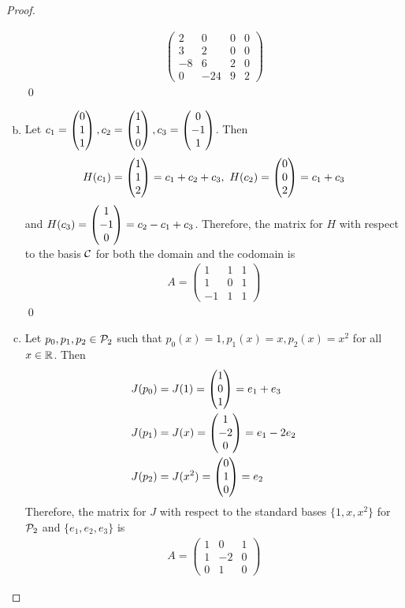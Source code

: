 \begin{proof}
\begin{enumerate}[(a)]
\[\begin{aligned}
\begin{pmatrix}
                    2 & 0 & 0 & 0\\
                    3 & 2 & 0 & 0\\
                    -8& 6 & 2 & 0\\
                    0 & -24 & 9 & 2
                \end{pmatrix}
            \end{aligned}
        \]\qed
        \item Let $c_1=\ColVecThree{0}{1}{1},c_2=\ColVecThree{1}{1}{0},c_3=\ColVecThree{0}{-1}{1}$. Then 
        \[
            \begin{aligned}
                &H(c_1)=\ColVecThree{1}{1}{2}=c_1+c_2+c_3,\ H(c_2)=\ColVecThree{0}{0}{2}=c_1+c_3\\
            \end{aligned}
        \]
        and $H(c_3)=\ColVecThree{1}{-1}{0}=c_2-c_1+c_3$. Therefore, the matrix for $H$ with respect to the basis $\C$ for both the domain and the codomain is 
        \[
            \begin{aligned}
                A=\begin{pmatrix}
                    1 & 1 & 1\\
                    1 & 0 & 1\\
                    -1 & 1 & 1
                \end{pmatrix}
            \end{aligned}
        \]\qed
        \item Let $p_0,p_1,p_2\in\P_2$ such that $p_0(x)=1,p_1(x)=x,p_2(x)=x^2$ for all $x\in\R$. Then 
        \[
            \begin{aligned}
                &J(p_0)=J(1)=\ColVecThree{1}{0}{1}=e_1+e_3\\
                &J(p_1)=J(x)=\ColVecThree{1}{-2}{0}=e_1-2e_2\\
                &J(p_2)=J(x^2)=\ColVecThree{0}{1}{0}=e_2
            \end{aligned}
        \]
        Therefore, the matrix for $J$ with respect to the standard bases $\{1,x,x^2\}$ for $\P_2$ and $\{e_1,e_2,e_3\}$ is 
        \[
            \begin{aligned}
                A=\begin{pmatrix}
                    1 & 0 & 1\\
                    1 & -2 & 0\\
                    0 & 1 & 0
                \end{pmatrix}
            \end{aligned}
\]
\end{enumerate}
\end{proof}
